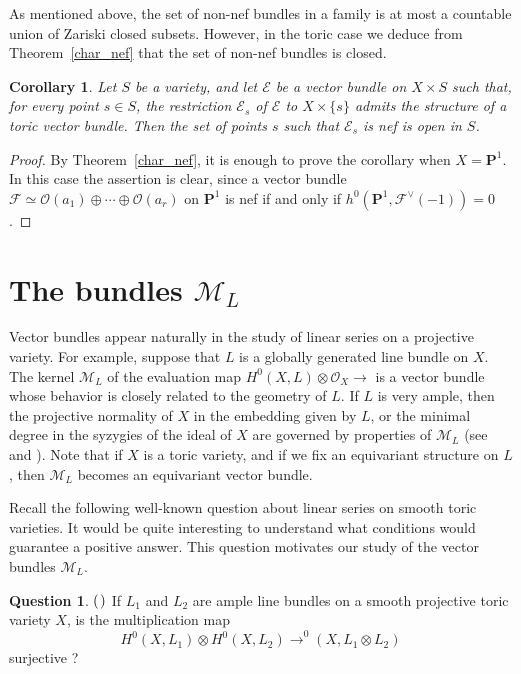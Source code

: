 \documentclass[12pt]{amsart}
\newtheorem{corollary}[lemma]{Corollary}
\theoremstyle{definition}
\newtheorem{question}[lemma]{Question}
\theoremstyle{remark}
\begin{document}
As mentioned above, the set
of non-nef bundles in a family is at most a countable union of Zariski closed
subsets. However, in the toric
case we deduce from Theorem~\ref{char_nef} that the set of non-nef bundles is closed.

\begin{corollary}\label{cor11}
Let $S$ be a variety, and let ${\mathcal{E}}$ be a vector bundle on $X \times S$ such that, for every point $s \in S$, the restriction ${\mathcal{E}}_s$ of ${\mathcal{E}}$ to $X \times \{s \}$ admits the structure of a toric vector bundle.  Then the set of points $s$ such that ${\mathcal{E}}_s$ is  nef is open in $S$.
\end{corollary}

\begin{proof}
By Theorem~\ref{char_nef}, it is enough to prove the
corollary when $X={{\mathbf P}}^1$. In this case the assertion is clear, since
a vector bundle ${\mathcal{F}} \simeq {\mathcal{O}}(a_1) \oplus \cdots \oplus {\mathcal{O}}(a_r)$
on ${{\mathbf P}}^1$ is nef if and only if $h^0({{\mathbf P}}^1,{\mathcal{F}}^\vee(-1))=0$.
\end{proof}

\section{The bundles ${\mathcal{M}}_L$} \label{M_L}

Vector bundles appear naturally in the study of
 linear series on a projective variety. For example, suppose that $L$ is a globally
generated line bundle on $X$. The kernel ${\mathcal{M}}_L$ of the
evaluation map $H^0(X,L)\otimes{\mathcal{O}}_X{\xrightarrow{\ \ }}$ is a vector bundle 
whose behavior is closely 
related to the geometry of $L$.
 If $L$ is very ample,
then the projective normality of $X$ in the embedding given by $L$,
or the minimal degree in the syzygies
 of the ideal of $X$ are governed by properties of ${\mathcal{M}}_L$
(see \cite{Gre1} and \cite{Gre2}). Note that if $X$ is a toric variety, 
and if we fix an equivariant structure on $L$,
then  ${\mathcal{M}}_{L}$  becomes an equivariant
vector bundle. 

Recall the following well-known question about linear series on
smooth toric varieties. It would be quite interesting to understand what conditions would guarantee a
positive answer. This question motivates our study of the
vector bundles ${\mathcal{M}}_L$.

\begin{question}\label{q1}${\rm (}$\cite{Oda1}${\rm )}$
If $L_1$ and $L_2$ are ample line bundles on a smooth projective
toric variety $X$, is the multiplication map
\begin{equation}\label{mult}
H^0(X,L_1)\otimes H^0(X,L_2){\xrightarrow{\ \ }}^0(X,L_1\otimes L_2)
\end{equation}
 surjective ?
\end{question}
\end{document}
